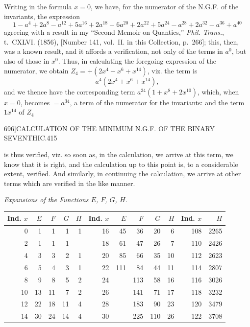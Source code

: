 \documentclass[11pt]{article}
\begin{document}
Writing in the formula $x = 0$, we have, for the numerator of the N.G.F. of the invariants, the expression
\[ 1 - a^{4} + 2a^{8} - a^{12} + 5a^{16} + 2a^{18} + 6a^{20} + 2a^{22} + 5a^{24} - a^{28} + 2a^{32} - a^{36} + a^{40} \]
agreeing with a result in my ``Second Memoir on Quantics,'' \textit{Phil. Trans.}, t.~CXLVI. (1856), [Number 141, vol.~II. in this Collection, p.~266]; this, then, was a known result, and it affords a verification, not only of the terms in $a^{0}$, but also of those in $x^{0}$. Thus, in calculating the foregoing expression of the numerator, we obtain $Z_{4} = +(2x^{4} + x^{6} + x^{14})$, viz. the term is
\[ a^{4}(2x^{4} + x^{6} + x^{14}), \]
and we thence have the corresponding term $a^{34}(1 + x^{8} + 2x^{10})$, which, when $x = 0$, becomes $= a^{34}$, a term of the numerator for the invariants: and the term $1 x^{14}$ of $Z_{4}$

\clearpage
\begin{center}\small 696]\hfill CALCULATION OF THE MINIMUM N.G.F. OF THE BINARY SEVENTHIC.\hfill 415\end{center}

is thus verified, viz. so soon as, in the calculation, we arrive at this term, we know that it is right, and the calculation up to this point is, to a considerable extent, verified. And similarly, in continuing the calculation, we arrive at other terms which are verified in the like manner.

\begin{center}\textit{Expansions of the Functions $E$, $F$, $G$, $H$.}\end{center}

\begin{center}\small
\begin{tabular}{r|rrrr|r|rrrr|r|r}
\textbf{Ind. $x$} & $E$ & $F$ & $G$ & $H$ & \textbf{Ind. $x$} & $E$ & $F$ & $G$ & $H$ & \textbf{Ind. $x$} & $H$ \\\hline
0  & 1   & 1   & 1   & 1  & 16 & 45   & 36   & 20   & 6   & 108 & 2265 \\
2  & 1   & 1   & 1   &    & 18 & 61   & 47   & 26   & 7   & 110 & 2426 \\
4  & 3   & 3   & 2   & 1  & 20 & 85   & 66   & 35   & 10  & 112 & 2623 \\
6  & 5   & 4   & 3   & 1  & 22 & 111  & 84   & 44   & 11  & 114 & 2807 \\
8  & 9   & 8   & 5   & 2  & 24 &      & 113  & 58   & 16  & 116 & 3026 \\
10 & 13  & 11  & 7   & 2  & 26 &      & 141  & 71   & 17  & 118 & 3232 \\
12 & 22  & 18  & 11  & 4  & 28 &      & 183  & 90   & 23  & 120 & 3479 \\
14 & 30  & 24  & 14  & 4  & 30 &      & 225  & 110  & 26  & 122 & 3708 \\
\end{tabular}
\end{center}
\end{document}

